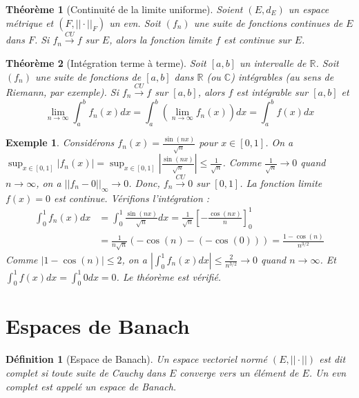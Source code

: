 \documentclass{article}
\newtheorem{theorem}{Théorème}
\newtheorem{definition}{Définition}
\newtheorem{example}{Exemple}
\begin{document}
\begin{theorem}[Continuité de la limite uniforme]
Soient $(E, d_E)$ un espace métrique et $(F, ||\cdot||_F)$ un evn. Soit $(f_n)$ une suite de fonctions continues de $E$ dans $F$. Si $f_n \xrightarrow{CU} f$ sur $E$, alors la fonction limite $f$ est continue sur $E$.
\end{theorem}

\begin{theorem}[Intégration terme à terme]
Soit $[a, b]$ un intervalle de $\mathbb{R}$. Soit $(f_n)$ une suite de fonctions de $[a, b]$ dans $\mathbb{R}$ (ou $\mathbb{C}$) intégrables (au sens de Riemann, par exemple). Si $f_n \xrightarrow{CU} f$ sur $[a, b]$, alors $f$ est intégrable sur $[a, b]$ et
\[
\lim_{n \to \infty} \int_a^b f_n(x) dx = \int_a^b \left( \lim_{n \to \infty} f_n(x) \right) dx = \int_a^b f(x) dx
\]
\end{theorem}

\begin{example}
Considérons $f_n(x) = \frac{\sin(nx)}{\sqrt{n}}$ pour $x \in [0, 1]$.
On a $\sup_{x \in [0, 1]} |f_n(x)| = \sup_{x \in [0, 1]} \left| \frac{\sin(nx)}{\sqrt{n}} \right| \le \frac{1}{\sqrt{n}}$.
Comme $\frac{1}{\sqrt{n}} \to 0$ quand $n \to \infty$, on a $||f_n - 0||_\infty \to 0$.
Donc, $f_n \xrightarrow{CU} 0$ sur $[0, 1]$. La fonction limite $f(x)=0$ est continue.
Vérifions l'intégration :
\begin{align*} \int_0^1 f_n(x) dx &= \int_0^1 \frac{\sin(nx)}{\sqrt{n}} dx = \frac{1}{\sqrt{n}} \left[ -\frac{\cos(nx)}{n} \right]_0^1 \\ &= \frac{1}{n\sqrt{n}} (-\cos(n) - (-\cos(0))) = \frac{1 - \cos(n)}{n^{3/2}} \end{align*}
Comme $|1-\cos(n)| \le 2$, on a $\left| \int_0^1 f_n(x) dx \right| \le \frac{2}{n^{3/2}} \to 0$ quand $n \to \infty$.
Et $\int_0^1 f(x) dx = \int_0^1 0 dx = 0$. Le théorème est vérifié.
\end{example}

\section{Espaces de Banach}

\begin{definition}[Espace de Banach]
Un espace vectoriel normé $(E, ||\cdot||)$ est dit complet si toute suite de Cauchy dans $E$ converge vers un élément de $E$. Un evn complet est appelé un espace de Banach.
\end{definition}
\end{document}
